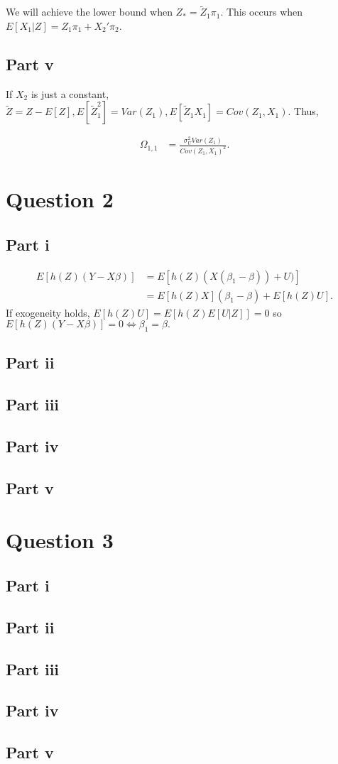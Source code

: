 \documentclass[11pt]{article} %
\begin{document}
We will achieve the lower bound when $Z_{*} = \tilde{Z}_1\pi_1$. This occurs when $E[X_1|Z] = Z_1\pi_1 + X_2'\pi_2$.
\subsection{Part v}
If $X_2$ is just a constant, $\tilde{Z} = Z-E[Z],E[\tilde{Z}_{1}^2] = Var(Z_1), E[\tilde{Z}_1X_1] = Cov(Z_1,X_1).$ Thus,

\begin{align*}
\Omega_{1,1} &= \frac{\sigma_U^2Var(Z_1)}{Cov(Z_1,X_1)^2}.
\end{align*}

\section{Question 2}
\subsection{Part i}
\begin{align*}
E[h(Z)(Y-X\beta)] &= E[h(Z)(X(\beta_1 - \beta)) + U)]\\
&= E[h(Z)X](\beta_1 - \beta) + E[h(Z)U].
\end{align*}
If exogeneity holds, $E[h(Z)U] = E[h(Z)E[U|Z]] = 0$ so $E[h(Z)(Y-X\beta)] = 0 \iff \beta_1 = \beta.$
\subsection{Part ii}
\subsection{Part iii}
\subsection{Part iv}
\subsection{Part v}
\section{Question 3}
\subsection{Part i}
\subsection{Part ii}
\subsection{Part iii}
\subsection{Part iv}
\subsection{Part v}
\end{document}
